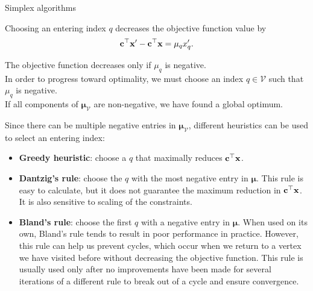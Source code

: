 \documentclass[11pt,compress,t,notes=noshow, xcolor=table]{beamer}
\begin{document}
\begin{vbframe}{Simplex algorithms}
\framebreak

Choosing an entering index $q$ decreases the objective function value by
$$
\mathbf{c}^\top \mathbf{x}' - \mathbf{c}^\top \mathbf{x} = \mu_q x'_q.
$$

\lz
\lz
The objective function decreases only if $\mu_q$ is negative.\\
\lz
In order to progress toward optimality, we must choose an index $q \in \mathcal{V}$ such that $\mu_q$ is negative.\\
\lz
If all components of $\boldsymbol{\mu}_{\mathcal{V}}$ are non-negative, we have found a global optimum.

\framebreak

Since there can be multiple negative entries in $\boldsymbol{\mu}_{\mathcal{V}}$, different heuristics can be used to select an entering index:

\begin{itemize}
    \item \textbf{Greedy heuristic}: choose a $q$ that maximally reduces $\mathbf{c}^\top \mathbf{x}$.
    \item \textbf{Dantzig's rule}: choose the $q$ with the most negative entry in $\boldsymbol{\mu}$. 
    This rule is easy to calculate, but it does not guarantee the maximum reduction in $\mathbf{c}^\top \mathbf{x}$. 
    It is also sensitive to scaling of the constraints.
    \item \textbf{Bland's rule}: choose the first $q$ with a negative entry in $\boldsymbol{\mu}$. 
    When used on its own, Bland's rule tends to result in poor performance in practice. 
    However, this rule can help us prevent cycles, which occur when we return to a vertex we have visited before without decreasing the objective function. 
    This rule is usually used only after no improvements have been made for several iterations of a different rule to break out of a cycle and ensure convergence.
\end{itemize}

\end{vbframe}
\end{document}
